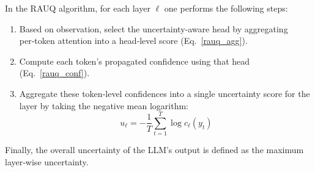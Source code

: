 \documentclass[letterpaper]{article} %
\begin{document}
In the RAUQ algorithm, for each layer \(\ell\) one performs the following steps:
\begin{enumerate}
    \item Based on observation, select the uncertainty‑aware head by aggregating per‑token attention into a head‑level score (Eq.~\ref{rauq_agg}).
    \item Compute each token’s propagated confidence using that head (Eq.~\ref{rauq_conf}).
    \item Aggregate these token‑level confidences into a single uncertainty score for the layer by taking the negative mean logarithm:
    {\footnotesize
    \begin{equation}
        u_\ell = -\frac{1}{T}\sum_{t=1}^T \log c_\ell(y_t)
    \end{equation}}
\end{enumerate}
Finally, the overall uncertainty of the LLM’s output is defined as the maximum layer‑wise uncertainty.
\end{document}
